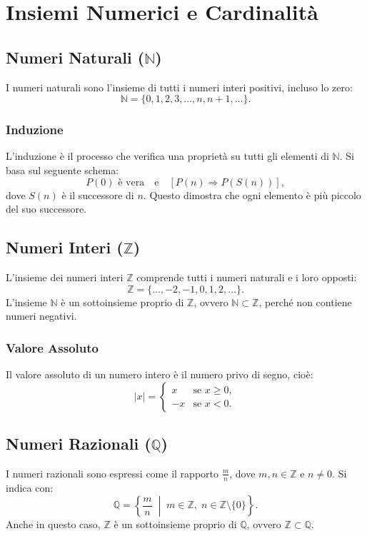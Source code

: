 \documentclass[a4paper,12pt]{article}
\begin{document}
\section*{Insiemi Numerici e Cardinalità}

\subsection*{Numeri Naturali (\( \mathbb{N} \))}
I numeri naturali sono l'insieme di tutti i numeri interi positivi, incluso lo zero:
\[
\mathbb{N} = \{0, 1, 2, 3, \ldots, n, n+1, \ldots\}.
\]

\subsubsection*{Induzione}
L'induzione è il processo che verifica una proprietà su tutti gli elementi di \( \mathbb{N} \). Si basa sul seguente schema:
\[
P(0) \text{ è vera} \quad \text{e} \quad \left[P(n) \Rightarrow P(S(n)) \right],
\]
dove \( S(n) \) è il successore di \( n \). Questo dimostra che ogni elemento è più piccolo del suo successore.

\subsection*{Numeri Interi (\( \mathbb{Z} \))}
L'insieme dei numeri interi \( \mathbb{Z} \) comprende tutti i numeri naturali e i loro opposti:
\[
\mathbb{Z} = \{\ldots, -2, -1, 0, 1, 2, \ldots\}.
\]
L'insieme \( \mathbb{N} \) è un sottoinsieme proprio di \( \mathbb{Z} \), ovvero \( \mathbb{N} \subset \mathbb{Z} \), perché non contiene numeri negativi.

\subsubsection*{Valore Assoluto}
Il valore assoluto di un numero intero è il numero privo di segno, cioè:
\[
|x| =
\begin{cases} 
x & \text{se } x \geq 0, \\ 
-x & \text{se } x < 0.
\end{cases}
\]

\subsection*{Numeri Razionali (\( \mathbb{Q} \))}
I numeri razionali sono espressi come il rapporto \( \frac{m}{n} \), dove \( m, n \in \mathbb{Z} \) e \( n \neq 0 \). Si indica con:
\[
\mathbb{Q} = \left\{\frac{m}{n} \; \middle| \; m \in \mathbb{Z}, \; n \in \mathbb{Z} \setminus \{0\} \right\}.
\]
Anche in questo caso, \( \mathbb{Z} \) è un sottoinsieme proprio di \( \mathbb{Q} \), ovvero \( \mathbb{Z} \subset \mathbb{Q} \).
\end{document}
